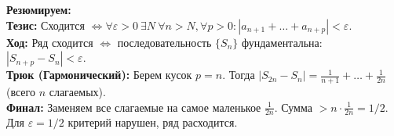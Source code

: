 \begin{tcolorbox}[colback=gray!5, colframe=black, boxrule=0.5pt, arc=0pt]
\textbf{Резюмируем:} \\
\textbf{Тезис:} Сходится $\iff \forall \varepsilon > 0 \ \exists N \ \forall n>N, \forall p>0: |a_{n+1} + \dots + a_{n+p}| < \varepsilon$. \\
\textbf{Ход:} Ряд сходится $\iff$ последовательность $\{S_n\}$ фундаментальна: $|S_{n+p} - S_n| < \varepsilon$. \\
\textbf{Трюк (Гармонический):} Берем кусок $p=n$. Тогда $|S_{2n} - S_n| = \frac{1}{n+1} + \dots + \frac{1}{2n}$ (всего $n$ слагаемых). \\
\textbf{Финал:} Заменяем все слагаемые на самое маленькое $\frac{1}{2n}$. Сумма $> n \cdot \frac{1}{2n} = 1/2$. Для $\varepsilon = 1/2$ критерий нарушен, ряд расходится.
\end{tcolorbox}